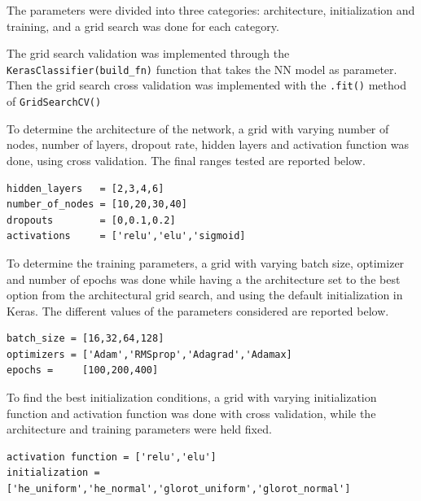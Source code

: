 \documentclass[prl,twocolumn]{revtex4-1}
\begin{document}
The parameters were divided into three categories: architecture, initialization and training, and a grid search was done for each category.

The grid search validation was implemented through the \texttt{KerasClassifier(build\_fn)} function that takes the NN model as parameter. Then the grid search cross validation was implemented with the \texttt{.fit()} method of \texttt{GridSearchCV()}

To determine the architecture of the network, a grid with varying number of nodes, number of layers, dropout rate, hidden layers and activation function was done, using cross validation. The final ranges tested are reported below.

\begin{lstlisting}[style=python]
hidden_layers   = [2,3,4,6]
number_of_nodes = [10,20,30,40]
dropouts        = [0,0.1,0.2]
activations     = ['relu','elu','sigmoid]
\end{lstlisting}

To determine the training parameters, a grid with varying batch size, optimizer and number of epochs was done while having a the architecture set to the best option from the architectural grid search, and using the default initialization in Keras. The different values of the parameters considered are reported below.
\begin{lstlisting}[style=python]
batch_size = [16,32,64,128]
optimizers = ['Adam','RMSprop','Adagrad','Adamax]
epochs =     [100,200,400]
\end{lstlisting}
To find the best initialization conditions, a grid with varying initialization function and activation function was done with cross validation, while the architecture and training parameters were held fixed. 
\begin{lstlisting}[style=python]
activation function = ['relu','elu']
initialization = ['he_uniform','he_normal','glorot_uniform','glorot_normal']
\end{lstlisting}
\end{document}
